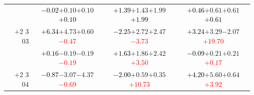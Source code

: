 \documentclass[compress]{beamer}
\begin{document}
\begin{frame}
\begin{tabular}{r | c | c | c}
          & \textcolor{black}{$-0.02$}\hspace{0.1 cm}$+0.10$\hspace{0.1 cm}$+0.10$\hspace{0.1 cm}\textcolor{black}{$+0.10$} & \textcolor{black}{$+1.39$}\hspace{0.1 cm}$+1.43$\hspace{0.1 cm}$+1.99$\hspace{0.1 cm}\textcolor{black}{$+1.99$} & \textcolor{black}{$+0.46$}\hspace{0.1 cm}$+0.61$\hspace{0.1 cm}$+0.61$\hspace{0.1 cm}\textcolor{black}{$+0.61$} \\
$+$2 3 03 & \textcolor{black}{$+6.34$}\hspace{0.1 cm}$+4.73$\hspace{0.1 cm}$+0.60$\hspace{0.1 cm}\textcolor{red}{$-0.47$} & \textcolor{black}{$-2.25$}\hspace{0.1 cm}$+2.72$\hspace{0.1 cm}$+2.47$\hspace{0.1 cm}\textcolor{red}{$-3.73$} & \textcolor{black}{$+3.24$}\hspace{0.1 cm}$+3.29$\hspace{0.1 cm}$-2.07$\hspace{0.1 cm}\textcolor{red}{$+19.70$} \\
          & \textcolor{black}{$+0.16$}\hspace{0.1 cm}$-0.19$\hspace{0.1 cm}$-0.19$\hspace{0.1 cm}\textcolor{red}{$-0.19$} & \textcolor{black}{$+1.63$}\hspace{0.1 cm}$+1.86$\hspace{0.1 cm}$+2.42$\hspace{0.1 cm}\textcolor{red}{$+3.50$} & \textcolor{black}{$-0.09$}\hspace{0.1 cm}$+0.21$\hspace{0.1 cm}$+0.21$\hspace{0.1 cm}\textcolor{red}{$+0.17$} \\
$+$2 3 04 & \textcolor{black}{$-0.87$}\hspace{0.1 cm}$-3.07$\hspace{0.1 cm}$-4.37$\hspace{0.1 cm}\textcolor{red}{$-0.69$} & \textcolor{black}{$-2.00$}\hspace{0.1 cm}$+0.59$\hspace{0.1 cm}$+0.35$\hspace{0.1 cm}\textcolor{red}{$+10.73$} & \textcolor{black}{$+4.20$}\hspace{0.1 cm}$+5.60$\hspace{0.1 cm}$+0.64$\hspace{0.1 cm}\textcolor{red}{$+3.92$} \\

\end{tabular}
\end{frame}
\end{document}
